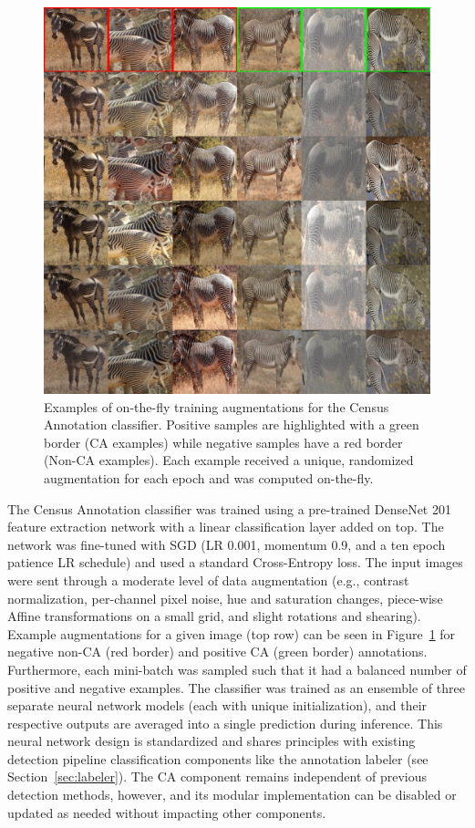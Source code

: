 \begin{figure}[!t]
    \begin{center}
        \includegraphics[width=0.70\linewidth]{resources/ca-augment.pdf}
    \end{center}
    \caption{Examples of on-the-fly training augmentations for the Census Annotation classifier.  Positive samples are highlighted with a green border (CA examples) while negative samples have a red border (Non-CA examples).  Each example received a unique, randomized augmentation for each epoch and was computed on-the-fly.}
    \label{fig:ca-augmentation}
\end{figure}

The Census Annotation classifier was trained using a pre-trained DenseNet 201~\cite{iandola_densenet:_2014} feature extraction network with a linear classification layer added on top.  The network was fine-tuned with SGD (LR 0.001, momentum 0.9, and a ten epoch patience LR schedule) and used a standard Cross-Entropy loss.  The input images were sent through a moderate level of data augmentation (e.g., contrast normalization, per-channel pixel noise, hue and saturation changes, piece-wise Affine transformations on a small grid, and slight rotations and shearing).  Example augmentations for a given image (top row) can be seen in Figure~\ref{fig:ca-augmentation} for negative non-CA (red border) and positive CA (green border) annotations.  Furthermore, each mini-batch was sampled such that it had a balanced number of positive and negative examples.  The classifier was trained as an ensemble of three separate neural network models (each with unique initialization), and their respective outputs are averaged into a single prediction during inference.  This neural network design is standardized and shares principles with existing detection pipeline classification components like the annotation labeler (see Section~\ref{sec:labeler}).  The CA component remains independent of previous detection methods, however, and its modular implementation can be disabled or updated as needed without impacting other components.

